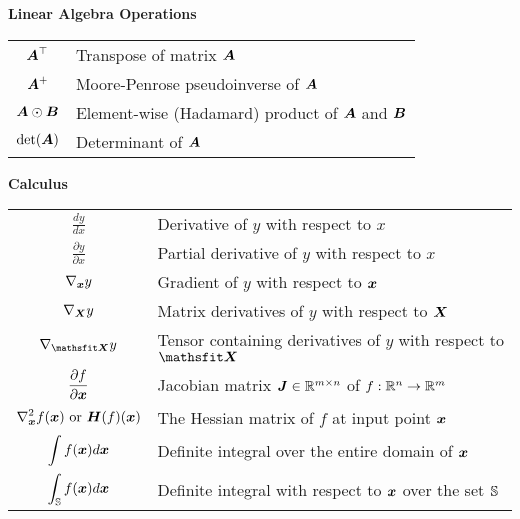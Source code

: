 \vspace{\notationgap}
\begin{minipage}{0.9\textwidth}
  \centerline{\bf Linear Algebra Operations}
  \bgroup
  \def\arraystretch{1.5}
  \begin{tabular}{cp{3.25in}}
    $\displaystyle {\bm{A}}^\top$ & Transpose of matrix ${\bm{A}}$ \\
    $\displaystyle {\bm{A}}^+$ & Moore-Penrose pseudoinverse of ${\bm{A}}$\\
    $\displaystyle {\bm{A}} \odot {\bm{B}} $ & Element-wise (Hadamard) product of ${\bm{A}}$ and ${\bm{B}}$ \\
    $\displaystyle \mathrm{det}({\bm{A}})$ & Determinant of ${\bm{A}}$ \\
  \end{tabular}
  \egroup
\end{minipage}

\vspace{\notationgap}
\begin{minipage}{0.9\textwidth}
  \centerline{\bf Calculus}
  \bgroup
  \def\arraystretch{1.5}
  \begin{tabular}{cp{3.25in}}
    $\displaystyle\frac{d y} {d x}$ & Derivative of $y$ with respect to $x$\\ [2ex]
    $\displaystyle \frac{\partial y} {\partial x} $ & Partial derivative of $y$ with respect to $x$ \\
    $\displaystyle \nabla_{\bm{x}} y $ & Gradient of $y$ with respect to ${\bm{x}}$ \\
    $\displaystyle \nabla_{\bm{X}} y $ & Matrix derivatives of $y$ with respect to ${\bm{X}}$ \\
    $\displaystyle \nabla_\tX y $ & Tensor containing derivatives of $y$ with respect to $\tX$ \\
    $\displaystyle \frac{\partial f}{\partial {\bm{x}}} $ & Jacobian matrix ${\bm{J}} \in \mathbb{R}^{m\times n}$ of $f: \mathbb{R}^n \rightarrow \mathbb{R}^m$\\
    $\displaystyle \nabla_{\bm{x}}^2 f({\bm{x}})\text{ or }{\bm{H}}( f)({\bm{x}})$ & The Hessian matrix of $f$ at input point ${\bm{x}}$\\
    $\displaystyle \int f({\bm{x}}) d{\bm{x}} $ & Definite integral over the entire domain of ${\bm{x}}$ \\
    $\displaystyle \int_{\mathbb{S}} f({\bm{x}}) d{\bm{x}}$ & Definite integral with respect to ${\bm{x}}$ over the set ${\mathbb{S}}$ \\
  \end{tabular}
  \egroup
\end{minipage}

